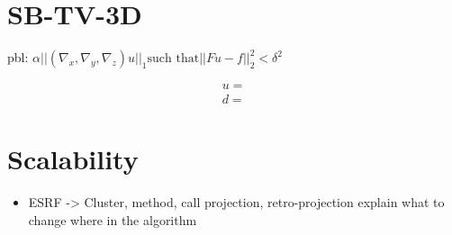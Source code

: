 \section{SB-TV-3D}
    pbl: $\alpha ||(\nabla_x,\nabla_y, \nabla_z)u||_1 \mbox{such that} ||Fu - f||_2^2 < \delta^2$
    
    \begin{equation}
        \begin{aligned}
            u =\\
            d =
        \end{aligned}
    \end{equation}
    
    \section{Scalability}
    \begin{itemize}
    	\item ESRF -> Cluster, method, call projection, retro-projection explain what to change where in the algorithm
    \end{itemize}
